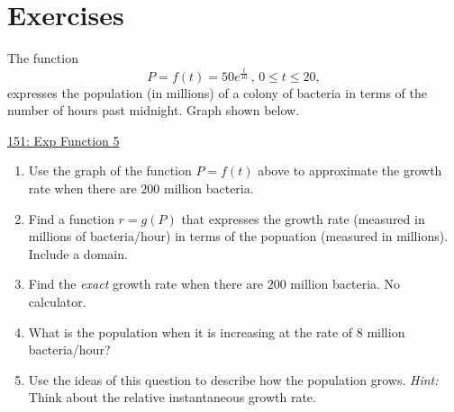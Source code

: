 \documentclass{ximera}
\begin{document}
\section{Exercises}

\begin{question} \label{Q677543345}
The function 
\[
     P = f(t) = 50 e^{\frac{t}{10}} \, , \, 0\leq t \leq 20 ,
\]
expresses the population (in millions) of a colony of bacteria in terms of the number of hours past  midnight. Graph shown below.

\begin{onlineOnly}
    \begin{center}
\end{center}
\end{onlineOnly}

\href{https://www.desmos.com/calculator/kffjsoepmo}{151: Exp Function 5}


\begin{enumerate}

\item Use the graph of the function $P=f(t)$ above to approximate the growth rate when there are $200$ million bacteria.

\item Find a function $r=g(P)$ that expresses the growth rate (measured in millions of bacteria/hour) in terms of the popuation (measured in millions). Include a domain.

\item Find the \emph{exact} growth rate when there are $200$ million bacteria. No calculator.

\item What is the population when it is increasing at the rate of $8$ million bacteria/hour?

\item Use the ideas of this question to describe how the population grows. \emph{Hint:} Think about the relative instantaneous growth rate.

\end{enumerate}
\end{question}
\end{document}

